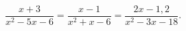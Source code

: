\begin{ex}[type=equation]
	\begin{condition}
		$\dfrac{x + 3}{x^2 - 5x - 6} = \dfrac{x - 1}{x^2 + x -6} = \dfrac{2x -1,2}{x^2 - 3x -18}.$
	\end{condition}
\end{ex}